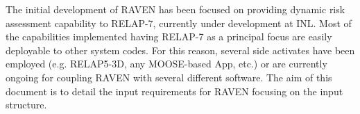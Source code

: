 The initial development of RAVEN has been focused on providing dynamic risk 
assessment capability to RELAP-7, currently under development at INL.
%
Most of the capabilities implemented having RELAP-7 as a principal focus are
easily deployable to other system codes.
%
For this reason, several side activates have been employed (e.g.  RELAP5-3D, any MOOSE-based App, etc.)
or are currently ongoing for coupling RAVEN with several different software.
%
The aim of this document is to detail the input requirements for RAVEN focusing
on the input structure.
